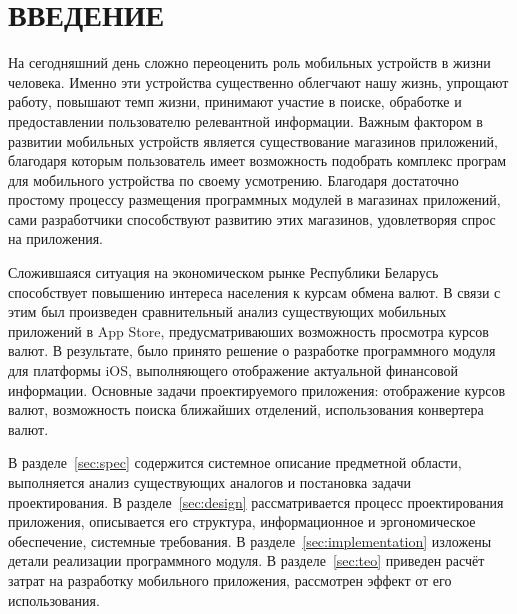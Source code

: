 \section*{ВВЕДЕНИЕ}

На сегодняшний день сложно переоценить роль мобильных устройств в жизни человека.
Именно эти устройства существенно облегчают нашу жизнь, упрощают работу,
повышают темп жизни, принимают участие в поиске, обработке и предоставлении
пользователю релевантной информации.
Важным фактором в развитии мобильных устройств является
существование магазинов приложений, благодаря которым пользователь имеет
возможность подобрать комплекс програм для мобильного устройства по своему усмотрению.
Благодаря достаточно простому процессу размещения программных модулей в магазинах
приложений, сами разработчики способствуют развитию этих магазинов, удовлетворяя
спрос на приложения.

Сложившаяся ситуация на экономическом рынке Республики Беларусь
способствует повышению интереса населения к курсам обмена валют.
В связи с этим был произведен сравнительный анализ существующих мобильных
приложений в App Store, предусматриваюших возможность просмотра курсов валют.
В результате, было принято решение о разработке программного
модуля для платформы iOS, выполняющего отображение актуальной финансовой
информации. Основные задачи проектируемого приложения: отображение курсов валют,
возможность поиска ближайших отделений, использования конвертера валют.

В разделе~\ref{sec:spec} содержится системное описание предметной области,
выполняется анализ существующих аналогов и постановка задачи проектирования.
В разделе~\ref{sec:design} рассматривается процесс проектирования приложения,
описывается его структура, информационное и эргономическое обеспечение,
системные требования.
В разделе~\ref{sec:implementation} изложены детали реализации программного модуля.
В разделе~\ref{sec:teo} приведен расчёт затрат на разработку
мобильного приложения, рассмотрен эффект от его использования.
